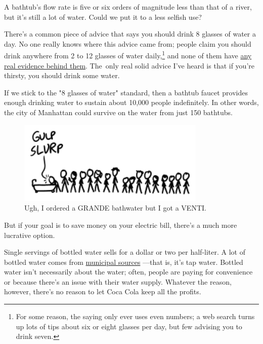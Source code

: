 {{A bathtub's flow rate is five or six orders of magnitude less than that of a river, but it's still a lot of water. Could we put it to a less selfish use?}

{There's a common piece of advice that says you should drink 8 glasses of water a day. No one really knows where this advice came from; people claim you should drink anywhere from 2 to 12 glasses of water daily,{\footnote{For some reason, the saying only ever uses even numbers; a web search turns up lots of tips about six or eight glasses per day, but few advising you to drink seven.} } and none of them have \href{http://www.mayoclinic.org/healthy-living/nutrition-and-healthy-eating/in-depth/water/art-20044256}{any real evidence behind them}. The only real solid advice I've heard is that if you're thirsty, you should drink some water.}

{If we stick to the "8 glasses of water" standard, then a bathtub faucet provides enough drinking water to sustain about 10,000 people indefinitely. In other words, the city of Manhattan could survive on the water from just 150 bathtubs.}

\begin{figure}[!htbp]
\centering
\includegraphics[scale=0.5, max width=0.8\textwidth]{imgs/a/91/faucet_line.png}
\caption{Ugh, I ordered a GRANDE bathwater but I got a VENTI.}
\end{figure}

{But if your goal is to save money on your electric bill, there's a much more lucrative option.}

{Single servings of bottled water sells for a dollar or two per half-liter. A lot of bottled water comes from \href{https://www.foodandwaterwatch.org/water/bottled/bottled-water-illusions-of-purity/}{municipal sources} —that is, it's tap water. Bottled water isn't necessarily about the water; often, people are paying for convenience or because there's an issue with their water supply. Whatever the reason, however, there's no reason to let Coca Cola keep all the profits.}

}
